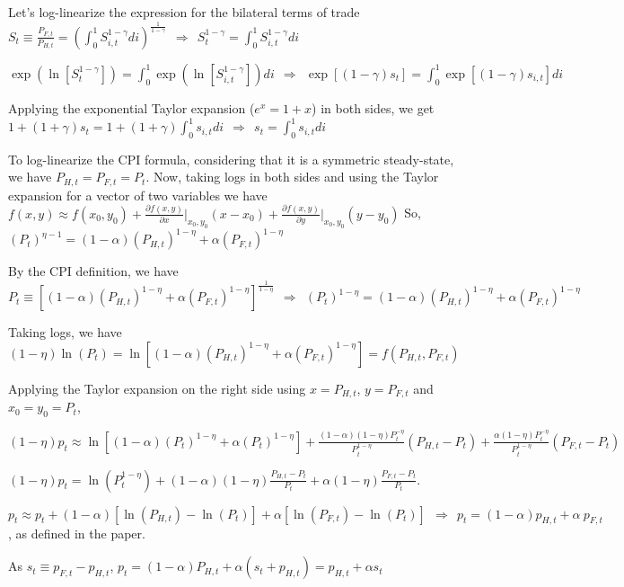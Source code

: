 \documentclass[
]{article}
\begin{document}
Let's log-linearize the expression for the bilateral terms of trade
\(\displaystyle S_t \equiv \frac{P_{F,t}}{P_{H,t}}= \left( \int_0^1 S_{i,t}^{1-\gamma}di \right)^{\frac{1}{1-\gamma}} \ \ \Rightarrow \ \ S_t^{1-\gamma} = \int_0^1 S_{i,t}^{1-\gamma}di\)

\(\displaystyle \exp \left(\ln \left[ S_t^{1-\gamma}\right] \right) = \int_0^1 \exp \left(\ln \left[ S_{i,t}^{1-\gamma}\right] \right)di \ \ \Rightarrow \ \ \exp[(1-\gamma)s_t]=\int_0^1 \exp[(1-\gamma)s_{i,t}]di\)

Applying the exponential Taylor expansion (\(e^x = 1 + x\)) in both
sides, we get
\(\displaystyle 1+(1+\gamma)s_t = 1 + (1+\gamma) \int_0^1 s_{i,t}di \ \ \Rightarrow \ \ s_t = \int_0^1 s_{i,t}di\)

To log-linearize the CPI formula, considering that it is a symmetric
steady-state, we have \(P_{H,t}=P_{F,t}=P_t\). Now, taking logs in both
sides and using the Taylor expansion for a vector of two variables we
have
\(\displaystyle f(x,y) \approx f(x_0,y_0)+\frac{\partial f(x,y)}{\partial x} \biggr|_{x_0,y_0}(x-x_0)+\frac{\partial f(x,y)}{\partial y} \biggr|_{x_0,y_0}(y-y_0)\)
So,
\(\displaystyle (P_t)^{\eta-1} = (1-\alpha)(P_{H,t})^{1-\eta} + \alpha(P_{F,t})^{1-\eta}\)

By the CPI definition, we have
\(\displaystyle P_t \equiv \left[ (1-\alpha)(P_{H,t})^{1-\eta} + \alpha(P_{F,t})^{1-\eta} \right]^{\frac{1}{1-\eta}} \ \ \Rightarrow \ \ (P_t)^{1-\eta} = (1-\alpha)(P_{H,t})^{1-\eta} + \alpha(P_{F,t})^{1-\eta}\)

Taking logs, we have
\((1-\eta)\ln(P_t) = \ln\left[ (1-\alpha)(P_{H,t})^{1-\eta} + \alpha(P_{F,t})^{1-\eta} \right]=f(P_{H,t},P_{F,t})\)

Applying the Taylor expansion on the right side using \(x = P_{H,t}\),
\(y = P_{F,t}\) and \(x_0 = y_0 = P_t\),

\(\displaystyle (1-\eta)p_t \approx \ln \left[ (1-\alpha)(P_t)^{1-\eta} + \alpha(P_t)^{1-\eta} \right]+ \frac{(1-\alpha)(1-\eta)P_t^{-\eta}}{P_t^{1-\eta}}(P_{H,t}-P_t) + \frac{\alpha(1-\eta)P_t^{-\eta}}{P_t^{1-\eta}}(P_{F,t}-P_t)\)

\(\displaystyle (1-\eta)p_t = \ln(P_t^{1-\eta}) + (1-\alpha)(1-\eta)\frac{P_{H,t}-P_t}{P_t} + \alpha(1-\eta)\frac{P_{F,t}-P_t}{P_t}\).

\(p_t \approx p_t + (1-\alpha)[\ln(P_{H,t})-\ln(P_t)] + \alpha[\ln(P_{F,t})-\ln(P_t)] \ \ \Rightarrow \ \  p_t = (1-\alpha)p_{H,t}+\alpha \ p_{F,t}\),
as defined in the paper.

As \(s_t \equiv p_{F,t}-p_{H,t}\),
\(p_t=(1-\alpha)P_{H,t}+\alpha (s_t+p_{H,t}) = p_{H,t} + \alpha s_t\)
\end{document}
